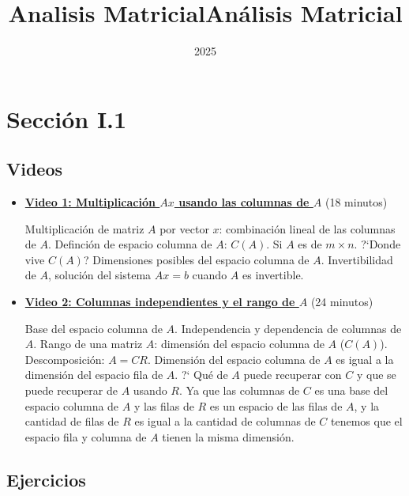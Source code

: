 \documentclass[12pt,a4paper]{article}
\title{Analisis Matricial}
\title{Análisis Matricial}
\author{}
\date{2025}
\newcommand\1{\mbox{\,\vrule height-0.8pt depth1.0pt width2pc\,}}
\newcommand\2{\mbox{\,\vrule height-0.8pt depth1.0pt width1pc\,}}
\begin{document}
\maketitle

\section{Sección I.1}

\subsection*{Videos}

\begin{itemize}
\item \href{https://youtu.be/_0AMEXou_5E}{\bf Video 1: Multiplicación $Ax$ usando las columnas de $A$} (18 minutos)

Multiplicaci\'on de matriz $A$ por vector $x$: combinaci\'on lineal de las columnas de $A$. Definci\'on de espacio columna de $A$: $C(A)$. Si $A$ es de $m\times n$. ?`Donde vive $C(A)$? Dimensiones posibles del espacio columna de $A$. Invertibilidad de $A$, soluci\'on del sistema $Ax=b$ cuando $A$ es invertible. 



\item \href{https://youtu.be/HjeNmsckPLw}{\bf Video 2: Columnas independientes y el rango de $A$} (24 minutos)


Base del espacio columna de $A$. Independencia y dependencia de columnas de $A$. Rango de una matriz $A$: dimensi\'on del espacio columna de $A$ ($C(A)$). Descomposici\'on: $A= CR$. Dimensi\'on del espacio columna de $A$ es igual a la dimensi\'on del espacio fila de $A$. ?` Qu\'e de $A$ puede recuperar con $C$ y que se puede recuperar de $A$ usando $R.$ Ya que las columnas de $C$ es una base del espacio columna de $A$ y las filas de $R$ es un espacio de las filas de $A$, y la cantidad de filas de $R$ es igual a la cantidad de columnas de $C$ tenemos que el espacio fila y columna de $A$ tienen la misma dimensi\'on.
\end{itemize}

\subsection*{Ejercicios}
\end{document}
